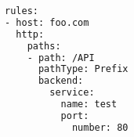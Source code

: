 \begin{lstfloat}
\begin{lstlisting}[language=bash, caption={Ukázka prvidla pro objekt ingress}, label={sample:ingress}]
rules:
- host: foo.com
  http:
    paths:
    - path: /API
      pathType: Prefix
      backend:
        service:
          name: test
          port: 
            number: 80
\end{lstlisting}
\end{lstfloat}